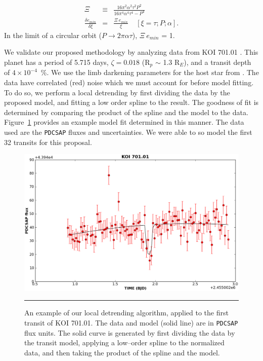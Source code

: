 \begin{eqnarray}
\Xi & \equiv & \frac{16 \pi^{2} \alpha^{2} \tau^{2} P^{2}}{16 \pi^{4} \alpha^{4} \tau^{4} - P^{4}} \\
\frac{\delta e_{min}}{\delta \xi} & = & \frac{\Xi~e_{min}}{\xi} ~~~~~ \left[\xi = \tau; P; \alpha \right].\nonumber
\label{eq-emin3}
\end{eqnarray}
In the limit of a circular orbit ($P \rightarrow 2 \pi \alpha \tau$),
$\Xi~e_{min}$ = 1.

\medskip
{\centerline{}}
\smallskip

We validate our proposed methodology by analyzing \kepler data from KOI
701.01 \citep[Kepler 62--b;][]{2013arXiv1304.7387B}.  This planet has
a period of 5.715 days, $\zeta = 0.018$ (R$_p$ $\sim$ 1.3 R$_E$), and
a transit depth of $4 \times 10^{-4}$~\%.  We use the limb darkening
parameters for the host star from
\cite{2010A&A...510A..21S}.  The \kepler data have correlated (red) noise
which we must account for before model fitting.  To do so, we perform
a local detrending by first dividing the data by the proposed model,
and fitting a low order spline to the result.  The goodness of fit is
determined by comparing the product of the spline and the model to the
data.  Figure~\ref{fig-koi70101} provides an example model fit
determined in this manner.  The data used are the {\tt PDCSAP} fluxes
and uncertainties.  We were able to so model the first 32 transits for
this proposal.

\begin{figure}[t] 
  \begin{minipage}[c]{0.6\textwidth}
    \includegraphics[width=\textwidth]{figures/701.01.eps}
  \end{minipage}\hfill
  \begin{minipage}[c]{0.4\textwidth}
    \caption{An example of our local detrending algorithm, applied to
      the first transit of KOI 701.01.  The data and model (solid
      line) are in {\tt PDCSAP} flux units.  The solid curve is
      generated by first dividing the data by the transit model,
      applying a low--order spline to the normalized data, and then
      taking the product of the spline and the model.}
    \label{fig-koi70101}
    \hspace*{\fill}  
    \hrule
  \end{minipage}
\end{figure}

